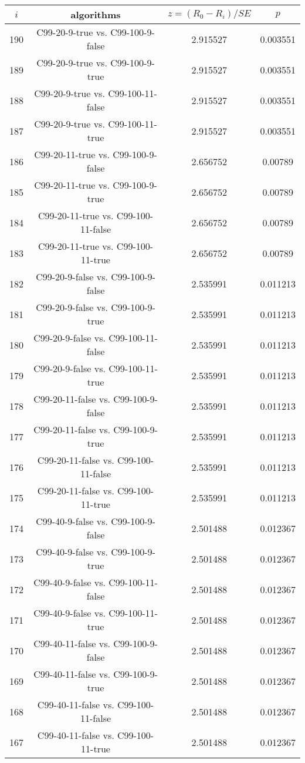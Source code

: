 \documentclass[a4paper,10pt]{article}
\begin{document}
\begin{landscape}
\begin{table}[!htp]
\centering\scriptsize
\begin{tabular}{cccc}
$i$&algorithms&$z=(R_0 - R_i)/SE$&$p$\\
\hline190&C99-20-9-true vs. C99-100-9-false&2.915527&0.003551\\
189&C99-20-9-true vs. C99-100-9-true&2.915527&0.003551\\
188&C99-20-9-true vs. C99-100-11-false&2.915527&0.003551\\
187&C99-20-9-true vs. C99-100-11-true&2.915527&0.003551\\
186&C99-20-11-true vs. C99-100-9-false&2.656752&0.00789\\
185&C99-20-11-true vs. C99-100-9-true&2.656752&0.00789\\
184&C99-20-11-true vs. C99-100-11-false&2.656752&0.00789\\
183&C99-20-11-true vs. C99-100-11-true&2.656752&0.00789\\
182&C99-20-9-false vs. C99-100-9-false&2.535991&0.011213\\
181&C99-20-9-false vs. C99-100-9-true&2.535991&0.011213\\
180&C99-20-9-false vs. C99-100-11-false&2.535991&0.011213\\
179&C99-20-9-false vs. C99-100-11-true&2.535991&0.011213\\
178&C99-20-11-false vs. C99-100-9-false&2.535991&0.011213\\
177&C99-20-11-false vs. C99-100-9-true&2.535991&0.011213\\
176&C99-20-11-false vs. C99-100-11-false&2.535991&0.011213\\
175&C99-20-11-false vs. C99-100-11-true&2.535991&0.011213\\
174&C99-40-9-false vs. C99-100-9-false&2.501488&0.012367\\
173&C99-40-9-false vs. C99-100-9-true&2.501488&0.012367\\
172&C99-40-9-false vs. C99-100-11-false&2.501488&0.012367\\
171&C99-40-9-false vs. C99-100-11-true&2.501488&0.012367\\
170&C99-40-11-false vs. C99-100-9-false&2.501488&0.012367\\
169&C99-40-11-false vs. C99-100-9-true&2.501488&0.012367\\
168&C99-40-11-false vs. C99-100-11-false&2.501488&0.012367\\
167&C99-40-11-false vs. C99-100-11-true&2.501488&0.012367\\

\end{tabular}
\end{table}
\end{landscape}
\end{document}
